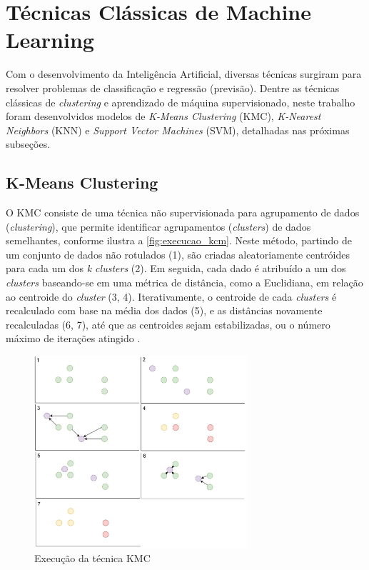 \section{Técnicas Clássicas de Machine Learning}

Com o desenvolvimento da Inteligência Artificial, diversas técnicas surgiram para resolver problemas de classificação e regressão (previsão). Dentre as técnicas clássicas de \textit{clustering} e aprendizado de máquina supervisionado, neste trabalho foram desenvolvidos modelos de \textit{K-Means Clustering} (KMC), \textit{K-Nearest Neighbors} (KNN) e \textit{Support Vector Machines} (SVM), detalhadas nas próximas subseções.

\subsection{K-Means Clustering}

O KMC consiste de uma técnica não supervisionada para agrupamento de dados (\textit{clustering}), que permite identificar agrupamentos (\textit{clusters}) de dados semelhantes, conforme ilustra a \autoref{fig:execucao_kcm}. Neste método, partindo de um conjunto de dados não rotulados (1), são criadas aleatoriamente centróides para cada um dos \textit{k clusters} (2). Em seguida, cada dado é atribuído a um dos \textit{clusters} baseando-se em uma métrica de distância, como a Euclidiana, em relação ao centroide do \textit{cluster} (3, 4). Iterativamente, o centroide de cada \textit{clusters} é recalculado com base na média dos dados (5), e as distâncias novamente recalculadas (6, 7), até que as centroides sejam estabilizadas, ou o número máximo de iterações atingido \cite{foley2019,nisbet2009}.

\begin{figure}[h]
  \centering
  \caption{Execução da técnica KMC}
   \label{fig:execucao_kcm}
   \includegraphics[width=0.7\textwidth]{figuras/fig_5.png}
\end{figure}

